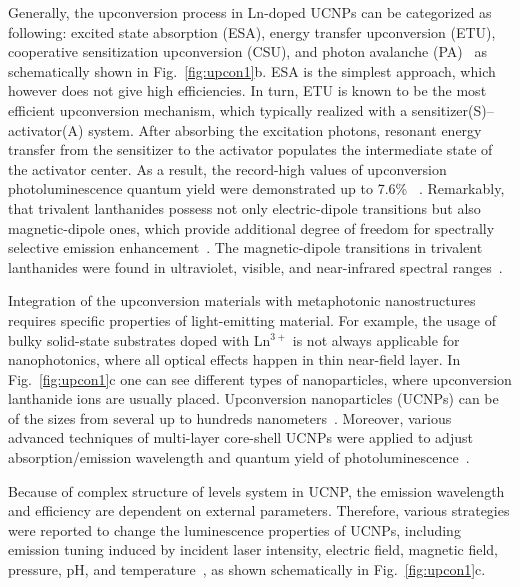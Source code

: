 \documentclass[journal=chreay,manuscript=review]{achemso}
\begin{document}
Generally, the upconversion process in Ln-doped UCNPs can be categorized as following:  excited state absorption (ESA), energy transfer upconversion (ETU), cooperative sensitization upconversion (CSU), and photon avalanche (PA)~\cite{bunzli2005taking, dong2013basic, wu2019expanding} as schematically shown in Fig.~\ref{fig:upcon1}b. ESA is the simplest approach, which however does not give high efficiencies. In turn, ETU is
known to be the most efficient upconversion mechanism, which typically
realized with a sensitizer(S)–activator(A) system. After absorbing the
excitation photons, resonant energy transfer from the sensitizer
to the activator populates the intermediate state of the activator center. As a result, the record-high values of upconversion photoluminescence quantum yield were demonstrated up to 7.6\% ~\cite{huang2014lanthanide}.
Remarkably, that trivalent lanthanides possess not only electric-dipole transitions but also magnetic-dipole ones, which provide additional degree of freedom for spectrally selective emission enhancement~\cite{baranov2017modifying}. The magnetic-dipole transitions in trivalent lanthanides were found in ultraviolet, visible, and near-infrared spectral ranges~\cite{dodson2012magnetic}. 

Integration of the upconversion materials with metaphotonic nanostructures requires specific properties of light-emitting material. For example, the usage of bulky solid-state substrates doped with Ln$^{3+}$ is not always applicable for nanophotonics, where all optical effects happen in thin near-field layer. 
In Fig.~\ref{fig:upcon1}c one can see different types of nanoparticles, where upconversion lanthanide ions are usually placed. Upconversion nanoparticles (UCNPs) can be of the sizes from several up to hundreds nanometers~\cite{zhou2015controlling, wen2018advances}. Moreover, various advanced techniques of multi-layer core-shell UCNPs were applied to adjust absorption/emission wavelength and quantum yield of photoluminescence~\cite{fan2019exploiting}.

Because of complex structure of levels system in UCNP, the emission wavelength and efficiency are dependent on external parameters. Therefore, various strategies were reported to change the luminescence properties of UCNPs, including emission tuning induced by incident laser intensity, electric field, magnetic field, pressure, pH, and temperature~\cite{gonzalez2015upconversion, wu2019expanding, zhou2020single}, as shown schematically in Fig.~\ref{fig:upcon1}c.
\end{document}
